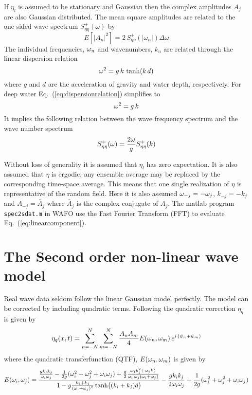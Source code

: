 If $\eta_{l}$ is assumed to be stationary and Gaussian then
the complex amplitudes $A_{j}$ are also Gaussian distributed.
The mean square amplitudes are related to the one-sided wave spectrum
$S_{\eta\eta}^{+}(\omega)$ by
\begin{equation}
  \label{eq:304}
  E[|A_{n }|^{2}] = 2\,S_{\eta\eta}^{+}(|\omega_{n}|) \Delta \omega
\end{equation}
The individual frequencies, $\omega _{n}$ and wavenumbers, $k_{n}$ are
related through the linear dispersion relation
\begin{equation}
  \label{eq:dispersionrelation}
  \omega ^{2} = g \,k\, \tanh(k\,d)
\end{equation}
where $g$ and $d$ are the acceleration of gravity and water depth,
respectively. For deep water Eq.~(\ref{eq:dispersionrelation}) simplifies to
\begin{equation}
  \label{eq:29}
  \omega ^{2} = g\,k
\end{equation}
It implies the following relation between
the wave frequency spectrum and the wave number spectrum
\begin{equation}
  \label{eq:33}
  S_{\eta\eta}^{+}(\omega ) = \frac{2\omega }{g} S_{\eta\eta}^{+}(k)
\end{equation}

Without loss of generality it is assumed that $\eta_{l}$ has zero expectation.
It is also assumed that $\eta$ is ergodic, \ie{} any  ensemble average
may be replaced by the corresponding time-space average.
This means that one single realization of $\eta$ is representative
of the random field.
Here it is also assumed $\omega _{-j} = -\omega _{j}$, $k_{-j} = -k_{j}$ and
$A_{-j} = \bar{A}_{j}$ where  $\bar{A}_{j}$ is
the complex conjugate of $A_{j}$.
The matlab program \verb+spec2sdat.m+ in WAFO use the Fast Fourier Transform (FFT)
to evaluate Eq.~(\ref{eq:linearcomponent}).

\section{The Second order non-linear wave model}
\label{sec:second-order-non}
Real wave data seldom follow the linear Gaussian model perfectly.
The  model can be corrected by including quadratic terms.
Following \cite{Langley1987Statistical} the quadratic correction
$\eta_{q}$ is given by
\begin{equation}
  \label{eq:nonlinearcomponent}
  \eta_{q}(x,t) = \sum_{n=-N}^{N} \sum_{m=-N}^{N} \frac{A_{n}A_{m}}{4} E(\omega _{n},\omega _{m})\,e^{i\,(\psi_{n}+\psi_{m})}
\end{equation}
where  the quadratic transferfunction (QTF), $E(\omega _{n},\omega _{m})$ is given by
\begin{equation}
\label{eq:QTF}
E(\omega _{i},\omega _{j}) = \frac{\frac{gk_{i}k_{j}}{\omega _{i}\omega _{j}} -
  \frac{1}{2g}(\omega _{i}^{2}+\omega _{j}^{2}+\omega _{i}\omega _{j})+\frac{g}{2}\frac{\omega _{i}k_{j}^{2}+\omega _{j}k_{i}^{2}}{\omega _{i}\,\omega _{j}(\omega _{i}+\omega _{j})}}{1-g\frac{k_{i}+k_{j}}{(\omega _{i}+\omega _{j})^{2}}\tanh\bigl((k_{i}+k_{j})d\bigr)}
-\frac{gk_{i}k_{j}}{2\omega _{i}\omega _{j}}+\frac{1}{2g}(\omega _{i}^{2}+\omega _{j}^{2}+\omega _{i}\omega _{j})
\end{equation}

